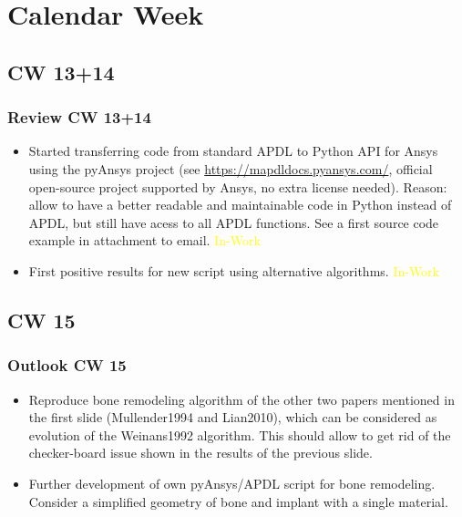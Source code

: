 \section{Calendar Week}
\subsection{CW 13+14}
\begin{frame}
  \frametitle{Review CW 13+14}
	\begin{itemize}
		\item Started transferring code from standard APDL to Python API for Ansys using the pyAnsys project (see \url{https://mapdldocs.pyansys.com/}, official open-source project supported by Ansys, no extra license needed). Reason: allow to have a better readable and maintainable code in Python instead of APDL, but still have acess to all APDL functions. See a first source code example in attachment to email.  \textcolor{yellow}{In-Work}
		\item First positive results for new script using alternative algorithms. \textcolor{yellow}{In-Work}
	\end{itemize}
\end{frame}

\subsection{CW 15}
\begin{frame}
  \frametitle{Outlook CW 15}
	\begin{itemize}
		\item Reproduce bone remodeling algorithm of the other two papers mentioned in the first slide (Mullender1994 and Lian2010), which can be considered as evolution of the Weinans1992 algorithm. This should allow to get rid of the checker-board issue shown in the results of the previous slide.
		\item Further development of own pyAnsys/APDL script for bone remodeling. Consider a simplified geometry of bone and implant with a single material.
	\end{itemize}
\end{frame}

